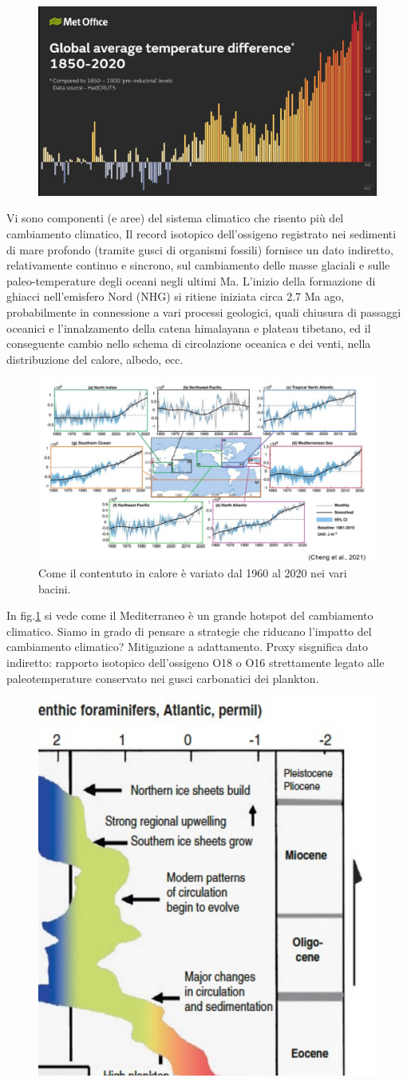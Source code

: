 \begin{figure}[htpb]
    \centering
    \includegraphics[width=0.5\linewidth]{uploads/global T.png}
\end{figure}
Vi sono componenti (e aree) del sistema climatico che risento più del cambiamento climatico, Il record isotopico dell’ossigeno registrato nei sedimenti
di mare profondo (tramite gusci di organismi fossili)
fornisce un dato indiretto, relativamente continuo e
sincrono, sul cambiamento delle masse glaciali e sulle
paleo-temperature degli oceani negli ultimi Ma. L’inizio della formazione di ghiacci nell’emisfero Nord (NHG) si ritiene iniziata
circa 2.7 Ma ago, probabilmente in connessione a vari processi geologici, quali
chiusura di passaggi oceanici e l’innalzamento della catena himalayana e
plateau tibetano, ed il conseguente cambio nello schema di circolazione
oceanica e dei venti, nella distribuzione del calore, albedo, ecc.
\begin{figure}[htpb]
    \centering
    \includegraphics[width=0.5\linewidth]{uploads/cont.png}
    \caption{Come il contentuto in calore è variato dal 1960 al 2020 nei vari bacini.}
    \label{fig:cont bacini}
\end{figure}
In fig.\ref{fig:cont bacini} si vede come il Mediterraneo è un grande hotspot del cambiamento climatico. 
Siamo in grado di pensare a strategie che riducano l'impatto del cambiamento climatico? Mitigazione a adattamento.
Proxy sisgnifica dato indiretto: rapporto isotopico dell'ossigeno O18 o O16 strettamente legato alle paleotemperature conservato nei gusci carbonatici dei plankton. 
\begin{figure}[htpb]
    \centering
    \includegraphics[width=0.5\linewidth]{uploads/deltaO18.png}
\end{figure}
